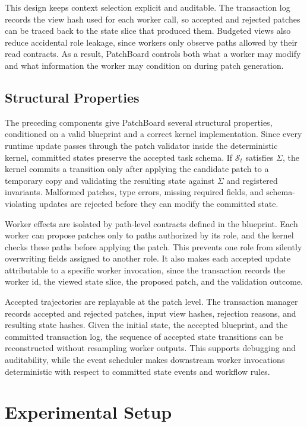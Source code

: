 \documentclass[11pt]{article}
\newcommand{\method}{PatchBoard}
\newcommand{\state}{\mathcal{S}}
\newcommand{\schema}{\Sigma}
\begin{document}
This design keeps context selection explicit and auditable. The transaction log records the view hash used for each worker call, so accepted and rejected patches can be traced back to the state slice that produced them. Budgeted views also reduce accidental role leakage, since workers only observe paths allowed by their read contracts. As a result, \method{} controls both what a worker may modify and what information the worker may condition on during patch generation.

\subsection{Structural Properties}
\label{sec:properties}

The preceding components give \method{} several structural properties, conditioned on a valid blueprint and a correct kernel implementation. Since every runtime update passes through the patch validator inside the deterministic kernel, committed states preserve the accepted task schema. If $\state_t$ satisfies $\schema$, the kernel commits a transition only after applying the candidate patch to a temporary copy and validating the resulting state against $\schema$ and registered invariants. Malformed patches, type errors, missing required fields, and schema-violating updates are rejected before they can modify the committed state.

Worker effects are isolated by path-level contracts defined in the blueprint. Each worker can propose patches only to paths authorized by its role, and the kernel checks these paths before applying the patch. This prevents one role from silently overwriting fields assigned to another role. It also makes each accepted update attributable to a specific worker invocation, since the transaction records the worker id, the viewed state slice, the proposed patch, and the validation outcome.

Accepted trajectories are replayable at the patch level. The transaction manager records accepted and rejected patches, input view hashes, rejection reasons, and resulting state hashes. Given the initial state, the accepted blueprint, and the committed transaction log, the sequence of accepted state transitions can be reconstructed without resampling worker outputs. This supports debugging and auditability, while the event scheduler makes downstream worker invocations deterministic with respect to committed state events and workflow rules.

\section{Experimental Setup}
\label{sec:experimental-setup}
\end{document}
